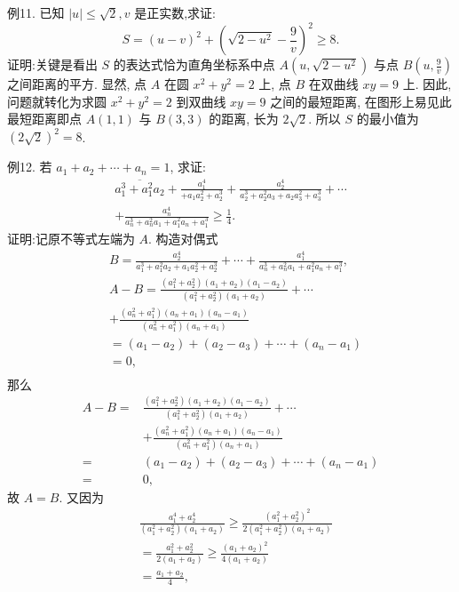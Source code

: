 例11. 已知 $|u| \leqslant \sqrt{2}, v$ 是正实数,求证:
$$
S=(u-v)^2+\left(\sqrt{2-u^2}-\frac{9}{v}\right)^2 \geqslant 8 .
$$
证明:关键是看出 $S$ 的表达式恰为直角坐标系中点 $A\left(u, \sqrt{2-u^2}\right)$ 与点 $B\left(u, \frac{9}{v}\right)$ 之间距离的平方.
显然, 点 $A$ 在圆 $x^2+y^2=2$ 上, 点 $B$ 在双曲线 $x y=9$ 上.
因此, 问题就转化为求圆 $x^2+y^2=2$ 到双曲线 $x y=9$ 之间的最短距离,
在图形上易见此最短距离即点 $A(1,1)$ 与 $B(3,3)$ 的距离, 长为 $2 \sqrt{2}$.
所以 $S$ 的最小值为 $(2 \sqrt{2})^2=8$.



例12. 若 $a_1+a_2+\cdots+a_n=1$, 求证:
$$
\begin{gathered}
\overline{a_1^3+a_1^2 a_2}+\frac{a_1^4}{+a_1 a_2^2+a_2^3}+\frac{a_2^4}{a_2^3+a_2^2 a_3+a_2 a_3^2+a_3^3}+\cdots \\
+\frac{a_n^4}{a_n^3+a_n^2 a_1+a_1^2 a_n+a_1^3} \geqslant \frac{1}{4} .
\end{gathered}
$$
证明:记原不等式左端为 $A$.
构造对偶式
$$
\begin{aligned}
& B=\frac{a_2^4}{a_1^3+a_1^2 a_2+a_1 a_2^2+a_2^3}+\cdots+\frac{a_1^4}{a_n^3+a_n^2 a_1+a_1^2 a_n+a_1^3}, \\
& A-B=\frac{\left(a_1^2+a_2^2\right)\left(a_1+a_2\right)\left(a_1-a_2\right)}{\left(a_1^2+a_2^2\right)\left(a_1+a_2\right)}+\cdots \\
& +\frac{\left(a_n^2+a_1^2\right)\left(a_n+a_1\right)\left(a_n-a_1\right)}{\left(a_n^2+a_1^2\right)\left(a_n+a_1\right)} \\
& =\left(a_1-a_2\right)+\left(a_2-a_3\right)+\cdots+\left(a_n-a_1\right) \\
& =0 \text {, } \\
&
\end{aligned}
$$
那么
$$
\begin{aligned}
A-B= & \frac{\left(a_1^2+a_2^2\right)\left(a_1+a_2\right)\left(a_1-a_2\right)}{\left(a_1^2+a_2^2\right)\left(a_1+a_2\right)}+\cdots \\
& +\frac{\left(a_n^2+a_1^2\right)\left(a_n+a_1\right)\left(a_n-a_1\right)}{\left(a_n^2+a_1^2\right)\left(a_n+a_1\right)} \\
= & \left(a_1-a_2\right)+\left(a_2-a_3\right)+\cdots+\left(a_n-a_1\right) \\
= & 0,
\end{aligned}
$$
故 $A=B$.
又因为
$$
\begin{aligned}
& \frac{a_1^4+a_2^4}{\left(a_1^2+a_2^2\right)\left(a_1+a_2\right)} \geqslant \frac{\left(a_1^2+a_2^2\right)^2}{2\left(a_1^2+a_2^2\right)\left(a_1+a_2\right)} \\
&=\frac{a_1^2+a_2^2}{2\left(a_1+a_2\right)} \geqslant \frac{\left(a_1+a_2\right)^2}{4\left(a_1+a_2\right)} \\
&=\frac{a_1+a_2}{4},
\end{aligned}
$$
